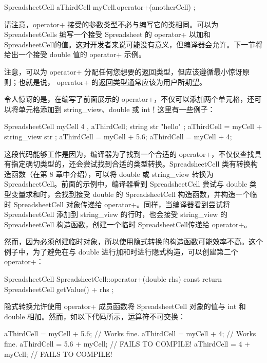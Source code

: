 \begin{cpp}
SpreadsheetCell aThirdCell { myCell.operator+(anotherCell) };
\end{cpp}

请注意，operator+ 接受的参数类型不必与编写它的类相同。可以为 SpreadsheetCells 编写一个接受 Spreadsheet 的 operator+ 以加和 SpreadsheetCell的值。这对开发者来说可能没有意义，但编译器会允许。下一节将给出一个接受 double 值的 operator+ 示例。

注意，可以为 operator+ 分配任何您想要的返回类型，但应该遵循最小惊讶原则；也就是说， operator+ 的返回类型通常应该为用户所期望。


令人惊讶的是，在编写了前面展示的 operator+，不仅可以添加两个单元格，还可以将单元格添加到 string\_view、double 或 int！这里有一些例子：

\begin{cpp}
SpreadsheetCell myCell { 4 }, aThirdCell;
string str { "hello" };
aThirdCell = myCell + string_view{ str };
aThirdCell = myCell + 5.6;
aThirdCell = myCell + 4;
\end{cpp}

这段代码能够工作是因为，编译器为了找到一个合适的 operator+，不仅仅查找具有指定确切类型的，还会尝试找到合适的类型转换。SpreadsheetCell 类有转换构造函数（在第 8 章中介绍），可以将 double 或 string\_view 转换为 SpreadsheetCell。前面的示例中，编译器看到 SpreadsheetCell 尝试与 double 类型变量求和时，会找到接受 double 的 SpreadsheetCell 构造函数，并构造一个临时 SpreadsheetCell 对象传递给 operator+。同样，当编译器看到尝试将 SpreadsheetCell 添加到 string\_view 的行时，也会接受 string\_view 的 SpreadsheetCell 构造函数，创建一个临时 SpreadsheetCell传递给 operator+。

然而，因为必须创建临时对象，所以使用隐式转换的构造函数可能效率不高。这个例子中，为了避免在与 double 进行加和时进行隐式构造，可以创建第二个 operator+：

\begin{cpp}
SpreadsheetCell SpreadsheetCell::operator+(double rhs) const
{
    return SpreadsheetCell { getValue() + rhs };
}
\end{cpp}


隐式转换允许使用 operator+ 成员函数将 SpreadsheetCell 对象的值与 int 和 double 相加。然而，如以下代码所示，运算符不可交换：

\begin{cpp}
aThirdCell = myCell + 5.6; // Works fine.
aThirdCell = myCell + 4; // Works fine.
aThirdCell = 5.6 + myCell; // FAILS TO COMPILE!
aThirdCell = 4 + myCell; // FAILS TO COMPILE!
\end{cpp}

